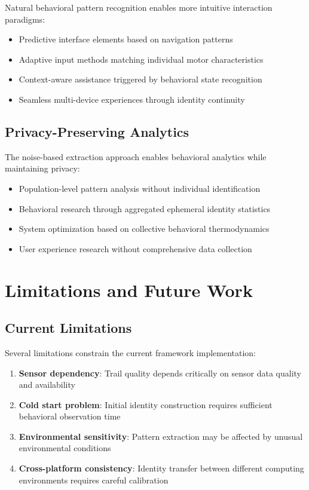 \documentclass[12pt,a4paper]{article}
\begin{document}
Natural behavioral pattern recognition enables more intuitive interaction paradigms:

\begin{itemize}
\item Predictive interface elements based on navigation patterns
\item Adaptive input methods matching individual motor characteristics
\item Context-aware assistance triggered by behavioral state recognition
\item Seamless multi-device experiences through identity continuity
\end{itemize}

\subsection{Privacy-Preserving Analytics}

The noise-based extraction approach enables behavioral analytics while maintaining privacy:

\begin{itemize}
\item Population-level pattern analysis without individual identification
\item Behavioral research through aggregated ephemeral identity statistics
\item System optimization based on collective behavioral thermodynamics
\item User experience research without comprehensive data collection
\end{itemize}

\section{Limitations and Future Work}

\subsection{Current Limitations}

Several limitations constrain the current framework implementation:

\begin{enumerate}
\item \textbf{Sensor dependency}: Trail quality depends critically on sensor data quality and availability
\item \textbf{Cold start problem}: Initial identity construction requires sufficient behavioral observation time
\item \textbf{Environmental sensitivity}: Pattern extraction may be affected by unusual environmental conditions
\item \textbf{Cross-platform consistency}: Identity transfer between different computing environments requires careful calibration
\end{enumerate}
\end{document}
